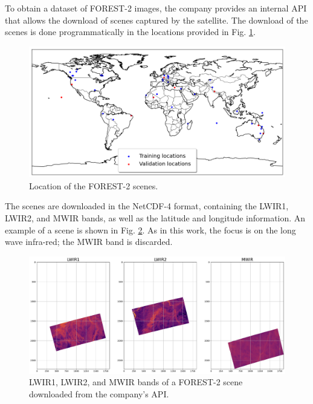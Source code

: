     To obtain a dataset of FOREST-2 images, the company provides an internal API that allows the download of scenes captured by the satellite. 
    The download of the scenes is done programmatically in the locations provided in Fig. \ref{fig:4-forest-locations}. 

    \begin{figure}[H]
        \centering
        \includegraphics[width=\linewidth]{Includes/4-forest-locations.png}
        \caption{Location of the FOREST-2 scenes.}
        \label{fig:4-forest-locations}
    \end{figure}

    The scenes are downloaded in the NetCDF-4 format, containing the LWIR1, LWIR2, and MWIR bands, as well as the latitude and longitude information. 
    An example of a scene is shown in Fig. \ref{fig:4-forest-complete example}. 
    As in this work, the focus is on the long wave infra-red; the MWIR band is discarded.

    \begin{figure}[H]
        \centering
        \includegraphics[width=\linewidth]{Includes/4-forest2-unprocessed-bands.pdf}
        \caption{LWIR1, LWIR2, and MWIR bands of a FOREST-2 scene downloaded from the company's API.}
        \label{fig:4-forest-complete example}
    \end{figure}


